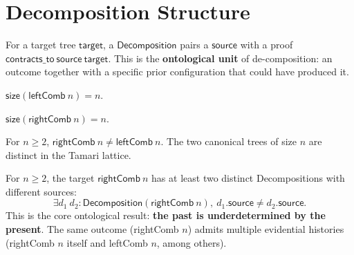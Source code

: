 \section{Decomposition Structure}

\begin{definition}[Decomposition]
\label{def:decomposition}
\leanok
{}
For a target tree $\mathsf{target}$, a $\mathsf{Decomposition}$ pairs a
$\mathsf{source}$ with a proof $\mathsf{contracts\_to}\ \mathsf{source}\ \mathsf{target}$.
This is the \textbf{ontological unit} of de-composition: an outcome together with
a specific prior configuration that could have produced it.
\end{definition}

\begin{theorem}
\label{thm:leftcomb_size}
\leanok
{}
$\mathsf{size}(\mathsf{leftComb}\ n) = n$.
\end{theorem}

\begin{theorem}
\label{thm:rightcomb_size}
\leanok
{}
$\mathsf{size}(\mathsf{rightComb}\ n) = n$.
\end{theorem}

\begin{theorem}
\label{thm:rightcomb_ne_leftcomb}
\leanok
{}
For $n \ge 2$, $\mathsf{rightComb}\ n \neq \mathsf{leftComb}\ n$.
The two canonical trees of size $n$ are distinct in the Tamari lattice.
\end{theorem}

\begin{theorem}
\label{thm:non_unique_decomposition}
\leanok
{}
For $n \ge 2$, the target $\mathsf{rightComb}\ n$ has at least two distinct
Decompositions with different sources:
\[
\exists d_1\ d_2 : \mathsf{Decomposition}(\mathsf{rightComb}\ n),\ d_1.\mathsf{source} \neq d_2.\mathsf{source}.
\]
This is the core ontological result: \textbf{the past is underdetermined by the
present}. The same outcome (rightComb $n$) admits multiple evidential histories
(rightComb $n$ itself and leftComb $n$, among others).
\end{theorem}

